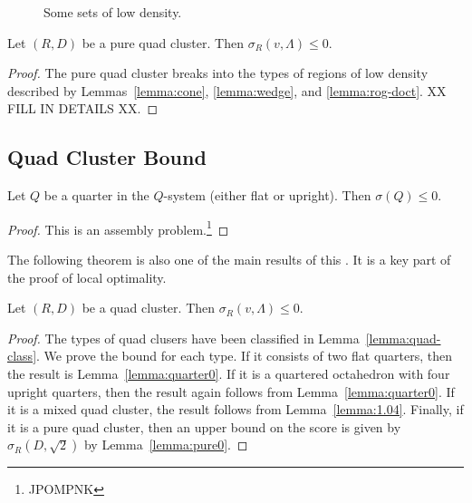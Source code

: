 \begin{figure}[htb]
  \centering
  \caption{Some sets of low density.}
  \label{fig:doct}
\end{figure}

\begin{lemma}\label{lemma:pure0}
Let $(R,D)$ be a pure quad cluster.  Then
  $\sigma_R(v,\Lambda)\le 0$.
\end{lemma}

\begin{proof}  The pure quad cluster breaks into the types
of regions of low density described by Lemmas~\ref{lemma:cone},
\ref{lemma:wedge}, and \ref{lemma:rog-doct}.  XX FILL IN DETAILS XX.
\end{proof}




\subsection{Quad Cluster Bound}

\begin{lemma} \label{lemma:quarter0}
Let $Q$ be a quarter in the $Q$-system (either flat or upright).
Then $\sigma(Q)\le 0$. 
\end{lemma}

\begin{proof} This is an assembly problem.\footnote{JPOMPNK}
\end{proof}


The following theorem is also one of the main results of this
\chap. It is a key part of the proof of local optimality.


\begin{theorem}\label{lemma:quad0} Let $(R,D)$ be a quad cluster.
Then $\sigma_R(v,\Lambda)\le 0$.
\end{theorem}

\begin{proof}
The types of quad clusers have been classified in Lemma~\ref{lemma:quad-class}.
We prove the bound for each type.
If it consists of two flat quarters, then the result is
Lemma~\ref{lemma:quarter0}.  If it is a quartered octahedron with
four upright quarters, then the result again follows from
Lemma~\ref{lemma:quarter0}.  If it is a mixed quad cluster,
the result follows from Lemma~\ref{lemma:1.04}.  Finally,
if it is a pure quad cluster, then an upper bound on the score
is given by $\sigma_R(D,\sqrt2)$ by Lemma~\ref{lemma:pure0}.  
\end{proof}







